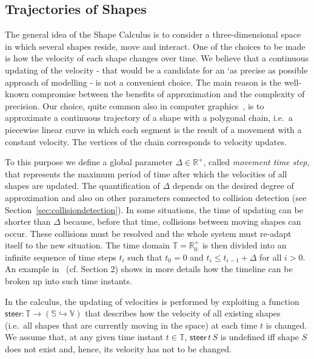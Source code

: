 \documentclass[11pt]{article}
\newcommand{\shapes}{\mathbb{S}}
\newcommand{\real}{\mathbb{R}}
\newcommand{\mts}{\Delta}
\newcommand{\move}{\ensuremath{\mathsf{steer}}}
\newcommand{\vel}{{\mathbb V}}
\newcommand{\timedomain}{{\mathbb T}}
\begin{document}
\subsection{Trajectories of Shapes}
\label{sec:trajectories}
The general idea of the Shape Calculus is to consider a three-dimensional space in which several shapes reside, move and interact. One of the choices to be made is how the velocity of each shape changes over time. We believe that a continuous updating of the velocity - that would be a candidate for an `as precise as possible approach of modelling - is not a convenient choice. The main reason is the well-known compromise between the benefits of approximation and the complexity of precision. Our choice, quite common also in computer graphics~\cite{Ericson2005}, is to approximate a continuous trajectory of a shape with a polygonal chain, i.e.\ a piecewise linear curve in which each segment is the result of a movement with a constant velocity. The vertices of the chain corresponds to velocity updates.

To this purpose we define a global parameter $\mts \in \real^+$, called \emph{movement time step},
that represents the maximum period of time after which the velocities of all shapes are updated.
The quantification of $\mts$ depends on the desired degree of approximation and also on other
parameters connected to collision detection (see Section~\ref{sec:collisiondetection}). In some situations, the time of updating can be shorter than $\mts$ because, before that time, collisions between moving shapes can occur. These collisions must be resolved and the whole system must re-adapt itself to the new situation. The time domain $\timedomain = \real^+_0$ is then divided into an infinite sequence of time steps $t_i$ such that $t_0=0$ and $t_i \leq t_{i-1} + \mts$ for all $i > 0$. An example in~\cite{Bartocci2010} (cf. Section 2) shows in more details how the timeline can be broken up into such time instants.

In the calculus, the updating of velocities is performed by exploiting a function $ \move \colon \timedomain \rightarrow (\shapes \hookrightarrow \vel)$ that describes how the velocity of all existing shapes (i.e.\ all shapes that are currently moving in the space) at each time $t$ is changed. We assume that, at any given time instant $t \in \timedomain$, $\move \, t \,S $ is undefined iff shape $S$ does not exist and, hence, its velocity has not to be changed.
\end{document}
